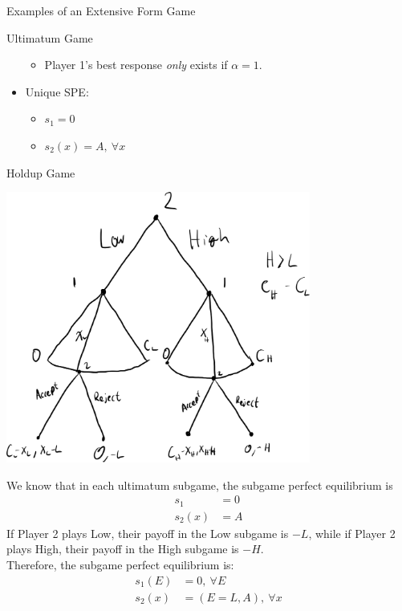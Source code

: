 \documentclass[8pt]{extarticle}
\begin{document}
\begin{problem}{Examples of an Extensive Form Game}
\begin{problem}{Ultimatum Game}
\begin{itemize}
\begin{itemize}
            \item Player 1's best response \textit{only} exists if $\alpha = 1$.
          \end{itemize}
        \item Unique SPE:
          \begin{itemize}
            \item $s_1 = 0$
            \item $s_2(x) = A,~\forall x$
          \end{itemize}
      \end{itemize}
    \end{problem}
    \begin{problem}{Holdup Game}
      \begin{center}
        \includegraphics[width=10cm]{images/holdup.png}
      \end{center}
      \tcblower
      We know that in each ultimatum subgame, the subgame perfect equilibrium is
      \begin{align*}
        s_1 &= 0\\
        s_2(x) &= A
      \end{align*}
      If Player 2 plays Low, their payoff in the Low subgame is $-L$, while if Player 2 plays High, their payoff in the High subgame is $-H$.\\

      Therefore, the subgame perfect equilibrium is:
      \begin{align*}
        s_1(E) &= 0,~\forall E\\
        s_2(x) &= (E=L,A),~\forall x
      \end{align*}
    \end{problem}
  \end{problem}
\end{document}

